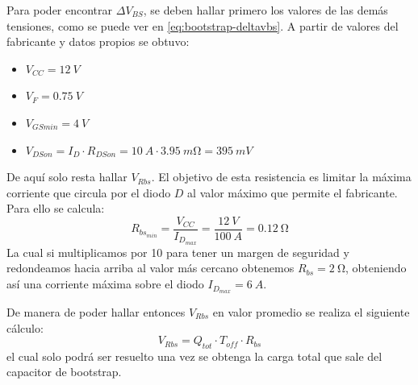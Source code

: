 \documentclass[titlepage, 12pt]{article}
\begin{document}
Para poder encontrar $\Delta V_{BS}$, se deben hallar primero los valores de las demás tensiones, como se puede ver en \eqref{eq:bootstrap-deltavbs}. A partir de valores del fabricante y datos propios se obtuvo:
    \begin{itemize}
        \item $V_{CC} = \SI{12}{V}$
        \item $V_F = \SI{0.75}{V}$
        \item $V_{GS min} = \SI{4}{V}$
        \item $V_{DS on} = I_D \cdot R_{DS on} = \SI{10}{A} \cdot \SI{3.95}{m\ohm} = \SI{395}{mV}$
    \end{itemize}

De aquí solo resta hallar $V_{Rbs}$. El objetivo de esta resistencia es limitar la máxima corriente que circula por el diodo $D$ al valor máximo que permite el fabricante. Para ello se calcula:
    \[
        R_{bs_{min}} = \frac{V_{CC}}{I_{D_{max}}} = \frac{\SI{12}{V}}{\SI{100}{A}} = \SI{0.12}{\ohm}
    \]
La cual si multiplicamos por 10 para tener un margen de seguridad y redondeamos hacia arriba al valor más cercano obtenemos $R_{bs} = \SI{2}{\ohm}$, obteniendo así una corriente máxima sobre el diodo $I_{D_{max}} = \SI{6}{A}$.

De manera de poder hallar entonces $V_{Rbs}$ en valor promedio se realiza el siguiente cálculo:
    \begin{equation}
        \label{eq:bootstrap-vrbs}
        V_{Rbs} = Q_{tot} \cdot T_{off} \cdot R_{bs}
    \end{equation}
el cual solo podrá ser resuelto una vez se obtenga la carga total que sale del capacitor de bootstrap.
\end{document}
